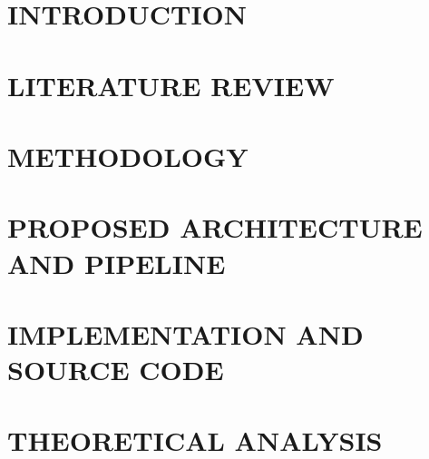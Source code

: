 \documentclass[a4paper,13pt,3p,twoside]{report}
\theoremstyle{definition}
\begin{document}
\glsaddall 
\renewcommand*{\acronymname}{LIST OF ABBREVIATIONS}
\renewcommand*{\entryname}{Abbreviation}
\renewcommand*{\descriptionname}{Definition}
\printnoidxglossaries

\renewcommand\appendixname{APPENDIX}
\renewcommand\appendixpagename{APPENDIX}
\renewcommand\appendixtocname{APPENDIX}

\renewcommand{\figurename}{Figure}
\renewcommand{\tablename}{Table}
\renewcommand{\chaptername}{CHAPTER}



\newpage
{}

\pagestyle{fancy}
\fancyhf{}
\fancyhead[RE, LO]{\leftmark}
\fancyfoot[RE, LO]{\thepage}

\chapter{INTRODUCTION}\label{ch:intro}

\newpage
\chapter{LITERATURE REVIEW}\label{ch:lit}


\newpage
\chapter{METHODOLOGY}\label{ch:method}


\newpage
\chapter{PROPOSED ARCHITECTURE AND PIPELINE}\label{ch:arch}


\newpage
\chapter{IMPLEMENTATION AND SOURCE CODE}\label{ch:impl}


\newpage
\chapter{THEORETICAL ANALYSIS}\label{ch:theory}

\end{document}
